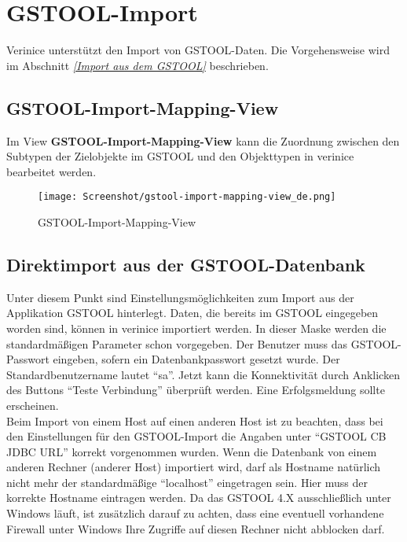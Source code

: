 \documentclass[a4paper,10pt]{book}
\begin{document}
\section{GSTOOL-Import}
Verinice unterstützt den Import von \textsc{GSTOOL}-Daten. Die Vorgehensweise wird im Abschnitt {\em \ref{Import aus dem GSTOOL} } beschrieben.

\subsection{GSTOOL-Import-Mapping-View}
Im View \textbf{GSTOOL-Import-Mapping-View} kann die Zuordnung zwischen den Subtypen der Zielobjekte im GSTOOL und den Objekttypen in verinice bearbeitet werden.
\begin{figure}[htb!]
  \centering
  \texttt{[image: Screenshot/gstool-import-mapping-view\_de.png]}
  \caption{\label{GSTOOL-Import-Mapping-View} GSTOOL-Import-Mapping-View}
\end{figure}

\subsection{Direktimport aus der GSTOOL-Datenbank}
Unter diesem Punkt sind Einstellungsmöglichkeiten zum Import aus der Applikation \textsc{GSTOOL} hinterlegt. Daten, die bereits im \textsc{GSTOOL}
eingegeben worden sind, können in verinice importiert werden. In dieser Maske werden die standardmäßigen Parameter schon vorgegeben.
Der Benutzer muss das \textsc{GSTOOL}-Passwort eingeben, sofern ein Datenbankpasswort gesetzt wurde. Der Standardbenutzername lautet ``sa''.
Jetzt kann die Konnektivität durch Anklicken des Buttons ``Teste Verbindung'' überprüft werden. Eine Erfolgsmeldung sollte erscheinen.
\newline\\
Beim Import von einem Host auf einen anderen Host ist zu beachten, dass bei den Einstellungen für den \textsc{GSTOOL}-Import die Angaben
unter ``\textsc{GSTOOL CB JDBC URL}'' korrekt vorgenommen wurden. Wenn die Datenbank von einem anderen Rechner (anderer Host) importiert wird,
darf als Hostname natürlich nicht mehr der standardmäßige ``localhost'' eingetragen sein. Hier muss der korrekte Hostname eintragen werden.
Da das \textsc{GSTOOL} 4.X ausschließlich unter Windows läuft, ist zusätzlich darauf zu achten, dass eine eventuell vorhandene Firewall unter Windows Ihre
Zugriffe auf diesen Rechner nicht abblocken darf.
\end{document}
